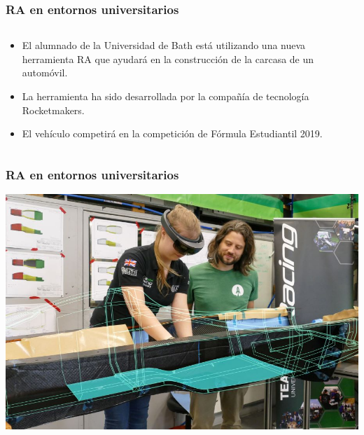 \begin{frame}
	\frametitle{RA en entornos universitarios}
		\begin{columns}
			\begin{column}{0.9\textwidth}
					\begin{itemize}
						\item El alumnado de la Universidad de Bath está utilizando una nueva herramienta RA que ayudará en la construcción de la carcasa de un automóvil.
						\item  La herramienta ha sido desarrollada por la compañía de tecnología Rocketmakers. 
						\item El vehículo competirá en la competición de Fórmula Estudiantil 2019.
						
					\end{itemize}
				\endblock{}
			\end{column}
		\end{columns}
		\endblock{}
\end{frame}	


\begin{frame}
	\frametitle{RA en entornos universitarios}
	\vfill 
	\begin{center}
		\includegraphics[width=0.8\linewidth]{Images/carARR}
	\end{center}
\end{frame}


